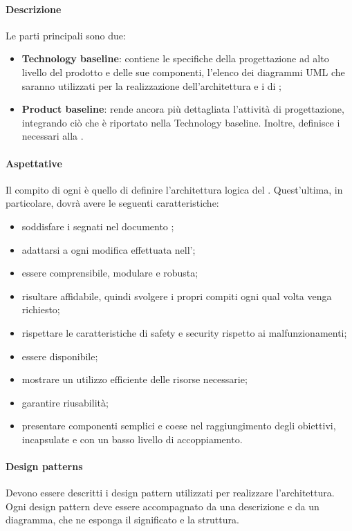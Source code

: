 \paragraph{Descrizione}
Le parti principali sono due:
\begin{itemize}
\item \textbf{Technology baseline}: contiene le specifiche della progettazione ad alto livello del prodotto e delle sue componenti, l'elenco dei diagrammi UML che saranno utilizzati per la realizzazione dell'architettura e i  di ;
\item \textbf{Product baseline}: rende ancora più dettagliata l'attività di progettazione, integrando ciò che è riportato nella Technology baseline. Inoltre, definisce i  necessari alla .
\end{itemize}
\paragraph{Aspettative}
Il compito di ogni \prog{} è quello di definire l'architettura logica del . Quest'ultima, in particolare, dovrà avere le seguenti caratteristiche:
\begin{itemize}
\item soddisfare i  segnati nel documento \AdR{};
\item adattarsi a ogni modifica effettuata nell'\AdR{};
\item essere comprensibile, modulare e robusta;
\item risultare affidabile, quindi svolgere i propri compiti ogni qual volta venga richiesto;
\item rispettare le caratteristiche di safety e security rispetto ai malfunzionamenti;
\item essere disponibile;
\item mostrare un utilizzo efficiente delle risorse necessarie;
\item garantire riusabilità;
\item presentare componenti semplici e coese nel raggiungimento degli obiettivi, incapsulate e con un basso livello di accoppiamento.
\end{itemize}
\paragraph{Design patterns}
Devono essere descritti i design pattern utilizzati per realizzare l'architettura. Ogni design pattern deve essere accompagnato da una descrizione e da un diagramma, che ne esponga il significato e la struttura.
